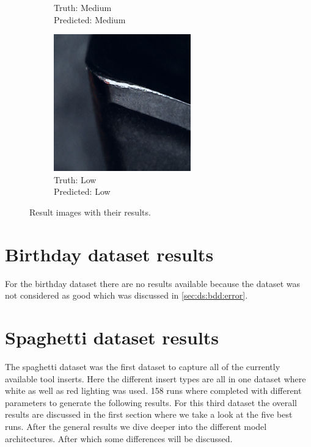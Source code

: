 \begin{figure}[hbtp]
\begin{subfigure}{0.31\textwidth}
	\caption{Truth: Medium \\Predicted: Medium}
	\end{subfigure}
	\hspace*{\fill}
	\begin{subfigure}{0.31\textwidth}
	\centering
	\includegraphics[width=\linewidth]{fig/results/wandb/second_handmade_sweep/images/pred1-truth1.png}
	\caption{Truth: Low \\Predicted: Low}
	\end{subfigure}
	\caption{Result images with their results.}
\end{figure}

\section{Birthday dataset results}
	For the birthday dataset there are no results available because the dataset was not considered as good which was discussed in \ref{sec:ds:bdd:error}.

\section{Spaghetti dataset results}
	The spaghetti dataset was the first dataset to capture all of the currently available tool inserts. Here the different insert types are all in one dataset where white as well as red lighting was used. 158 runs where completed with different parameters to generate the following results.
	For this third dataset the overall results are discussed in the first section where we take a look at the five best runs. After the general results we dive deeper into the different model architectures. After which some differences will be discussed.

